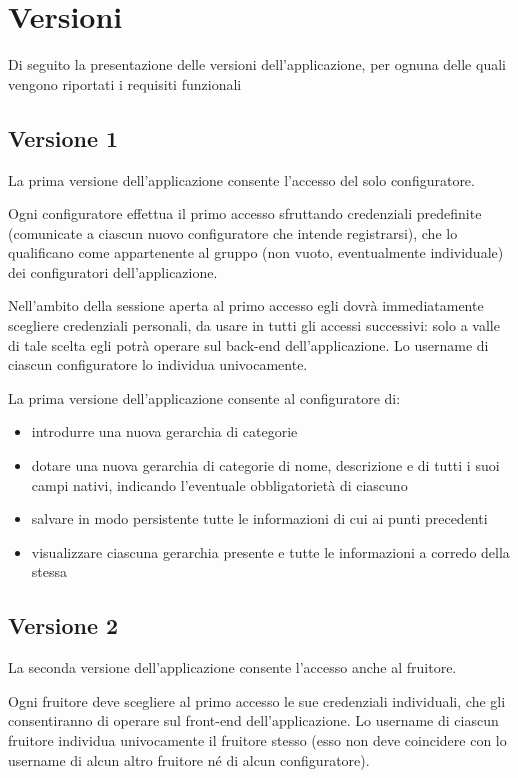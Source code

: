 \section{Versioni}
Di seguito la presentazione delle versioni dell'applicazione, per ognuna delle quali vengono riportati i requisiti funzionali


\subsection{Versione 1}
La prima versione dell’applicazione consente l’accesso del solo configuratore.

Ogni configuratore effettua il primo accesso sfruttando credenziali predefinite (comunicate a ciascun nuovo configuratore che intende registrarsi), che lo qualificano come appartenente al gruppo (non vuoto, eventualmente individuale) dei configuratori dell’applicazione. 

Nell’ambito della sessione aperta al primo accesso egli dovrà immediatamente scegliere credenziali personali, da usare in tutti gli accessi successivi: solo a valle di tale scelta egli potrà operare sul back-end dell’applicazione. Lo username di ciascun configuratore lo individua univocamente.

La prima versione dell’applicazione consente al configuratore di: 
\begin{itemize}
    \item introdurre una nuova gerarchia di categorie
    \item dotare una nuova gerarchia di categorie di nome, descrizione e di tutti i suoi campi nativi, indicando l'eventuale obbligatorietà di ciascuno
    \item salvare in modo persistente tutte le informazioni di cui ai punti precedenti
    \item visualizzare ciascuna gerarchia presente e tutte le informazioni a corredo della stessa
\end{itemize}

\subsection{Versione 2}
La seconda versione dell’applicazione consente l’accesso anche al fruitore. 

Ogni fruitore deve scegliere al primo accesso le sue credenziali individuali, che gli consentiranno di operare sul front-end dell’applicazione. Lo username di ciascun fruitore individua univocamente il fruitore stesso (esso non deve coincidere con lo username di alcun altro fruitore né di alcun configuratore).

